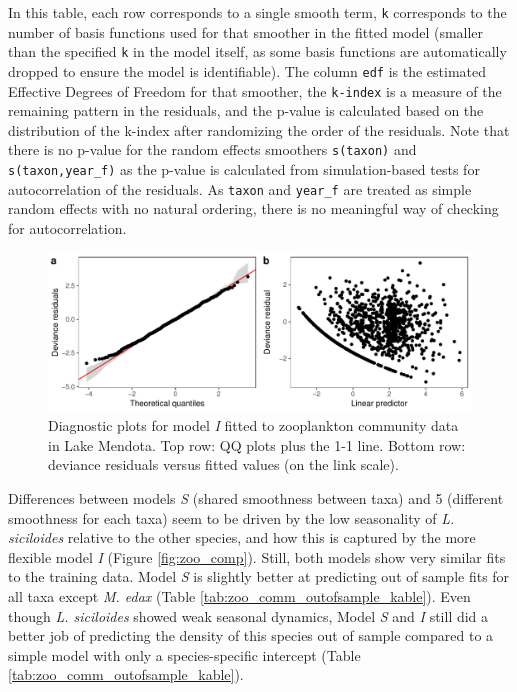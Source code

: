 \documentclass[12pt]{article}
\begin{document}
In this table, each row corresponds to a single smooth term,
\texttt{k\textquotesingle{}} corresponds to the number of basis
functions used for that smoother in the fitted model (smaller than the
specified \texttt{k} in the model itself, as some basis functions are
automatically dropped to ensure the model is identifiable). The column
\texttt{edf} is the estimated Effective Degrees of Freedom for that
smoother, the \texttt{k-index} is a measure of the remaining pattern in
the residuals, and the p-value is calculated based on the distribution
of the k-index after randomizing the order of the residuals. Note that
there is no p-value for the random effects smoothers \texttt{s(taxon)}
and \texttt{s(taxon,year\_f)} as the p-value is calculated from
simulation-based tests for autocorrelation of the residuals. As
\texttt{taxon} and \texttt{year\_f} are treated as simple random effects
with no natural ordering, there is no meaningful way of checking for
autocorrelation.

\begin{figure}
\centering
\includegraphics{../figures/zoo_comm_diag-1.pdf}
\caption{\label{fig:zoo_comm_diag_plot} Diagnostic plots for model
\emph{I} fitted to zooplankton community data in Lake Mendota. Top row:
QQ plots plus the 1-1 line. Bottom row: deviance residuals versus fitted
values (on the link scale).}
\end{figure}

Differences between models \emph{S} (shared smoothness between taxa) and
5 (different smoothness for each taxa) seem to be driven by the low
seasonality of \emph{L. siciloides} relative to the other species, and
how this is captured by the more flexible model \emph{I} (Figure
\ref{fig:zoo_comp}). Still, both models show very similar fits to the
training data. Model \emph{S} is slightly better at predicting out of
sample fits for all taxa except \emph{M. edax} (Table
\ref{tab:zoo_comm_outofsample_kable}). Even though \emph{L. siciloides}
showed weak seasonal dynamics, Model \emph{S} and \emph{I} still did a
better job of predicting the density of this species out of sample
compared to a simple model with only a species-specific intercept (Table
\ref{tab:zoo_comm_outofsample_kable}).
\end{document}
